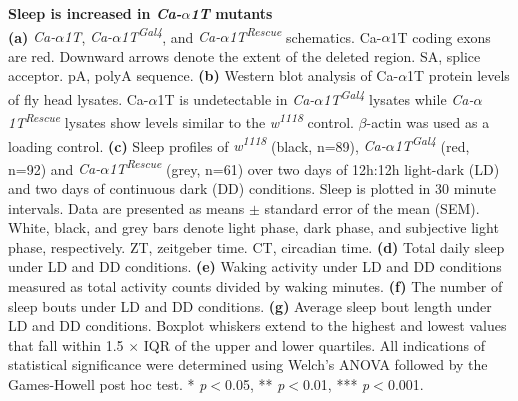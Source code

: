 \label{fig:3}
\textbf{Sleep is increased in \emph{Ca-$\alpha$1T} mutants}
\\
\textbf{(a)} \emph{Ca-$\alpha$1T}, \emph{Ca-$\alpha$1T\textsuperscript{Gal4}}, and \emph{Ca-$\alpha$1T\textsuperscript{Rescue}} schematics. 
Ca-$\alpha$1T coding exons are red.
Downward arrows denote the extent of the deleted region.
SA, splice acceptor.
pA, polyA sequence.  
\textbf{(b)} Western blot analysis of Ca-$\alpha$1T protein levels of fly head lysates.
Ca-$\alpha$1T is undetectable in \emph{Ca-$\alpha$1T\textsuperscript{Gal4}} lysates while \emph{Ca-$\alpha$1T\textsuperscript{Rescue}} lysates show levels similar to the \emph{w\textsuperscript{1118}} control.
$\beta$-actin was used as a loading control.
\textbf{(c)} Sleep profiles of \emph{w\textsuperscript{1118}} (black, n=89), \emph{Ca-$\alpha$1T\textsuperscript{Gal4}} (red, n=92) and \emph{Ca-$\alpha$1T\textsuperscript{Rescue}}  (grey, n=61) over two days of 12h:12h light-dark (LD) and two days of continuous dark (DD) conditions.
Sleep is plotted in 30 minute intervals.
Data are presented as means $\pm$ standard error of the mean (SEM).
White, black, and grey bars denote light phase, dark phase, and subjective light phase, respectively.
ZT, zeitgeber time.
CT, circadian time.
\textbf{(d)} Total daily sleep under LD and DD conditions.
\textbf{(e)} Waking activity under LD and DD conditions measured as total activity counts divided by waking minutes.
\textbf{(f)} The number of sleep bouts under LD and DD conditions.
\textbf{(g)} Average sleep bout length under LD and DD conditions.
Boxplot whiskers extend to the highest and lowest values that fall within 1.5 $\times$ IQR of the upper and lower quartiles.
All indications of statistical significance were determined using Welch's ANOVA followed by the Games-Howell post hoc test.
* \emph{p}$<$0.05, ** \emph{p}$<$0.01, *** \emph{p}$<$0.001.

